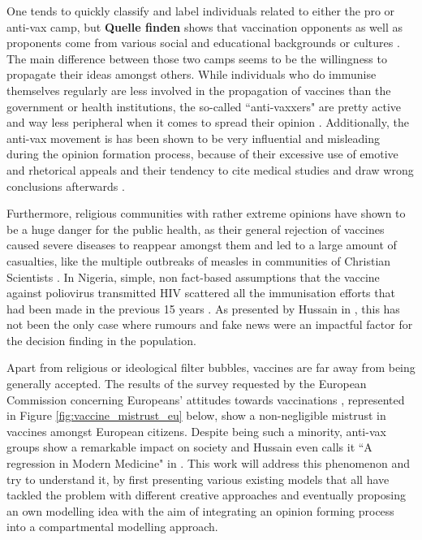 \documentclass[12pt,a4paper,twoside]{article}
\begin{document}
One tends to quickly classify and label individuals related to either the pro or anti-vax camp, but \textbf{Quelle finden} shows that vaccination opponents as well as proponents come from various social and educational backgrounds or cultures%
. The main difference between those two camps seems to be the willingness to propagate their ideas amongst others. While individuals who do immunise themselves regularly are less involved in the propagation of vaccines than the government or health institutions, the so-called ``anti-vaxxers" are pretty active and way less peripheral when it comes to spread their opinion \cite{Johnson2020}. Additionally, the anti-vax movement is has been shown to be very influential and misleading during the opinion formation process, because of their excessive use of emotive and rhetorical appeals and their tendency to cite medical studies and draw wrong conclusions afterwards \cite{Davies2002}.\newline

Furthermore, religious communities with rather extreme opinions have shown to be a huge danger for the public health, as their general rejection of vaccines caused severe diseases to reappear amongst them and led to a large amount of casualties, like the multiple outbreaks of measles in communities of Christian Scientists \cite{Novotny1988}. In Nigeria, simple, non fact-based assumptions that the vaccine against poliovirus transmitted \ac{HIV} scattered all the immunisation efforts that had been made in the previous 15 years \cite{Pincock2004}. As presented by Hussain in \cite{Hussain2018}, this has not been the only case where rumours and fake news were an impactful factor for the decision finding in the population.\newline

Apart from religious or ideological filter bubbles, vaccines are far away from being generally accepted. The results of the survey requested by the European Commission concerning Europeans' attitudes towards vaccinations \cite{KantarBelgium2019}, represented in Figure \ref{fig:vaccine_mistrust_eu} below, show a non-negligible mistrust in vaccines amongst European citizens. Despite being such a minority, anti-vax groups show a remarkable impact on society and Hussain even calls it ``A regression in Modern Medicine" in \cite{Hussain2018}. This work will address this phenomenon and try to understand it, by first presenting various existing models that all have tackled the problem with different creative approaches and eventually proposing an own modelling idea with the aim of integrating an opinion forming process into a compartmental modelling approach.
\end{document}
